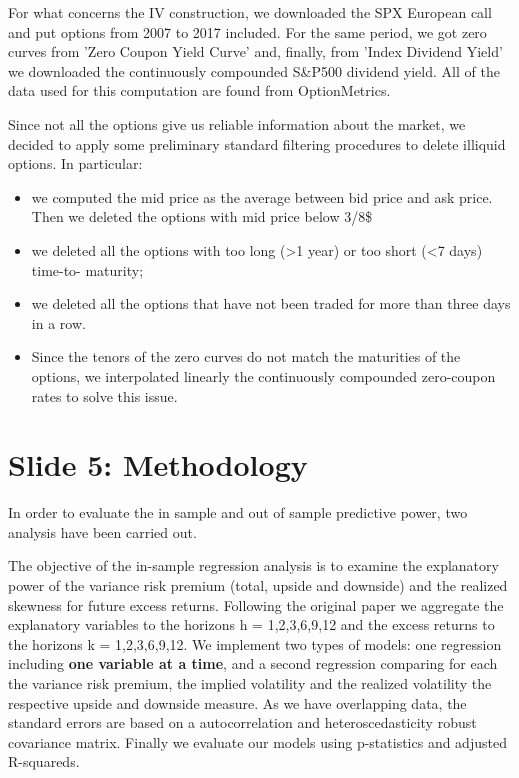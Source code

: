 \documentclass[12pt, letterpaper]{article}
\begin{document}
\vspace{3mm}
\noindent
For what concerns the IV construction, we downloaded the SPX European call and put options from 2007 to 2017 included. For the same period, we got zero curves from ’Zero Coupon Yield Curve’ and, finally, from ’Index Dividend Yield’ we downloaded the continuously compounded S\&P500 dividend yield.
All of the data used for this computation are found from OptionMetrics.

\vspace{3mm}
\noindent
Since not all the options give us reliable information about the market, we decided to apply some preliminary standard filtering procedures to delete illiquid options. In particular:

\begin{itemize}
\item  we computed the mid price as the average between bid price and ask price. Then we deleted the options with mid price below 3/8\$
\item  we deleted all the options with too long (>1 year) or too short (<7 days) time-to- maturity;
\item  we deleted all the options that have not been traded for more than three days in a row.
\item Since the tenors of the zero curves do not match the maturities of the options, we interpolated linearly the continuously compounded zero-coupon rates to solve this issue.
\end{itemize}

\section{Slide 5: Methodology}
In order to evaluate the in sample and out of sample predictive power, two analysis have been carried out. 

\vspace{3mm}
\noindent
The objective of the in-sample regression analysis is to examine the explanatory power of the variance risk premium (total, upside and downside) and the realized skewness for future excess returns. Following the original paper we aggregate the explanatory variables to the horizons h = 1,2,3,6,9,12 and the excess returns to the horizons k = 1,2,3,6,9,12. We implement two types of models: one regression including \textbf{one variable at a time}, and a second regression comparing for each the variance risk premium, the implied volatility and the realized volatility the respective upside and downside measure. 
As we have overlapping data, the standard errors are based on a autocorrelation and heteroscedasticity robust covariance matrix. Finally we evaluate our models using p-statistics and adjusted R-squareds.
\end{document}
